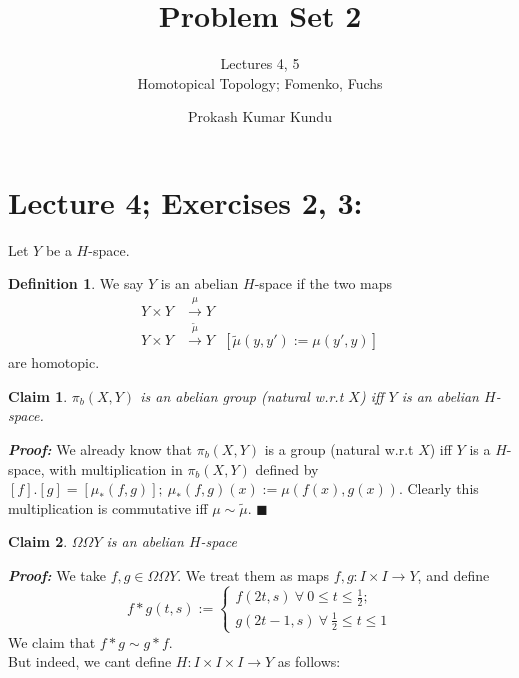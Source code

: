 \documentclass[11pt]{article}
\numberwithin{equation}{section}
\begin{document}
\newtheorem{thm}{Theorem}[section]
\newtheorem{ex}[thm]{Exercise}
\newtheorem{cor}[thm]{Corollary}
\newtheorem{lem}[thm]{Lemma}
\newtheorem{clm}[thm]{Claim}
\newtheorem{prop}[thm]{Proposition}
\newtheorem{rem}[thm]{Remark}
\newtheorem{rem*}{Remark}
\theoremstyle{definition}
\newtheorem{defn}{Definition}[section]
\newtheorem{eg}{Example}[section] 

\title{Problem Set 2}
    \author{Lectures 4, 5\\Homotopical Topology; Fomenko, Fuchs}
    \date{Prokash Kumar Kundu}
    \maketitle
    
\section{\normalsize{Lecture 4; Exercises 2, 3:}}
Let $Y$ be a $H$-space. 
\begin{defn}
     We say $Y$ is an abelian $H$-space if the two maps
    \begin{align*}
         Y\times Y&\xrightarrow{\mu}Y\\ Y\times Y&\xrightarrow{\tilde{\mu}}Y\ \ \ [\tilde{\mu}(y,y'):= \mu(y',y)]
    \end{align*} 
     are homotopic.
\end{defn}
\begin{clm}
    $\pi_b(X,Y)$ is an abelian group (natural w.r.t $X$) iff $Y$ is an abelian $H$-space.  
\end{clm}
\textbf{\emph{Proof:}} We already know that $\pi_b(X,Y)$ is a group (natural w.r.t $X$) iff $Y$ is a $H$-space, with multiplication in $\pi_b(X,Y)$ defined by $[f].[g]= [\mu_{*}(f,g)];\ \mu_{*}(f,g)(x):=\mu(f(x), g(x))$. Clearly this multiplication is commutative iff $\mu\sim\tilde{\mu}$. $\blacksquare$ 
\begin{clm}
    $\Omega\Omega Y$ is an abelian $H$-space
\end{clm}
\textbf{\emph{Proof:}} We take $f, g\in\Omega\Omega Y$. We treat them as maps $f,g:I\times I \rightarrow Y$, and define $$f*g(t,s):=\begin{cases}f(2t,s)\ \forall\ 0\leqslant t\leqslant\frac{1}{2}; \\ g(2t-1, s)\ \forall\ \frac{1}{2}\leqslant t\leqslant1\end{cases}$$ We claim that $f*g\sim g*f$. \\[8pt] 
But indeed, we cant define $H:I\times I\times I\rightarrow Y$ as follows: 
\end{document}
